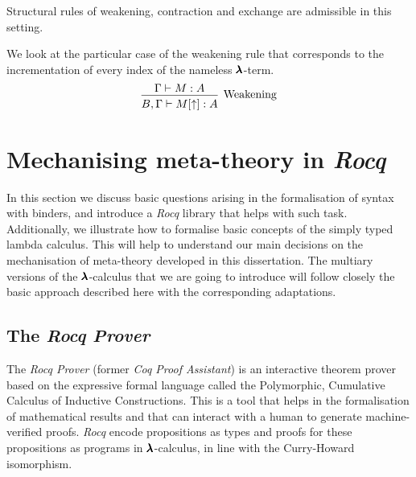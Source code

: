 \begin{comment}
\begin{remark}
  \label{nameless_typing_remark}
  For such strict definitions of contexts and typing rules we would require admissibility for structural rules (like the weakening rule shown below).
  \[
    \begin{prooftree}
      \hypo{ \Gamma \vdash M:A }
      \infer1[Weakening]{ B, \Gamma \vdash M[\uparrow]:A } 
    \end{prooftree}
  \]
  That way, we show that our contexts as sequences may behave as multisets (as expected).
\end{remark}
\end{comment}

\begin{claim}
  \label{nameless_typing_claim}  
  Structural rules of weakening, contraction and exchange are admissible in this setting.
\end{claim}

We look at the particular case of the weakening rule that corresponds to the incrementation of every index of the nameless $\pmb{\lambda}$-term.
\[
  \begin{prooftree}
    \hypo{ \Gamma \vdash M:A }
    \infer1[Weakening]{ B, \Gamma \vdash M[\uparrow]:A } 
  \end{prooftree}
\]


\section{Mechanising meta-theory in \textit{Rocq}}

In this section we discuss basic questions arising in the formalisation of syntax with binders, and introduce a \textit{Rocq} library that helps with such task.
Additionally, we illustrate how to formalise basic concepts of the simply typed lambda calculus.
This will help to understand our main decisions on the mechanisation of meta-theory developed in this dissertation.
The multiary versions of the $\pmb{\lambda}$-calculus that we are going to introduce will follow closely the basic approach described here with the corresponding adaptations.

\subsection{The \textit{Rocq Prover}}

The \textit{Rocq Prover} (former \textit{Coq Proof Assistant}) \cite{RocqManual} is an interactive theorem prover based on the expressive formal language called the Polymorphic, Cumulative Calculus of Inductive Constructions.
This is a tool that helps in the formalisation of mathematical results and that can interact with a human to generate machine-verified proofs.
\textit{Rocq} encode propositions as types and proofs for these propositions as programs in $\pmb{\lambda}$-calculus, in line with the Curry-Howard isomorphism.

